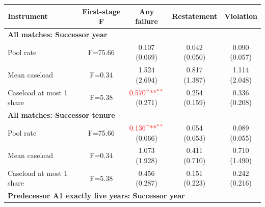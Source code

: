 \documentclass[10pt]{article}
\newcommand{\sym}[1]{\textsuperscript{#1}}
\begin{document}
\begin{minipage}{19cm}\fontsize{10}{12}\selectfont\setlength{\tabcolsep}{4pt}\renewcommand{\arraystretch}{1.12}


\def\sym#1{\ifmmode^{#1}\else\(^{#1}\)\fi}
\centering
{}
\begin{threeparttable}
\begin{tabular}{p{}cccc}
\toprule
Instrument & First-stage F & Any failure & Restatement & Violation \\
\midrule
\multicolumn{5}{l}{\textbf{All matches: Successor year}} \\
Pool rate & F=75.66 & \shortstack{0.107\\(0.069)} & \shortstack{0.042\\(0.050)} & \shortstack{0.090\\(0.057)} \\
Mean caseload & F=0.34 & \shortstack{1.524\\(2.694)} & \shortstack{0.817\\(1.387)} & \shortstack{1.114\\(2.048)} \\
Caseload at most 1 share & F=5.38 & \shortstack{\textcolor{red}{0.570\sym{**}}\\(0.271)} & \shortstack{0.254\\(0.159)} & \shortstack{0.336\\(0.208)} \\
\multicolumn{5}{l}{\textbf{All matches: Successor tenure}} \\
Pool rate & F=75.66 & \shortstack{\textcolor{red}{0.136\sym{**}}\\(0.066)} & \shortstack{0.054\\(0.053)} & \shortstack{0.089\\(0.055)} \\
Mean caseload & F=0.34 & \shortstack{1.073\\(1.928)} & \shortstack{0.411\\(0.710)} & \shortstack{0.710\\(1.490)} \\
Caseload at most 1 share & F=5.38 & \shortstack{0.456\\(0.287)} & \shortstack{0.151\\(0.223)} & \shortstack{0.242\\(0.216)} \\
\multicolumn{5}{l}{\textbf{Predecessor A1 exactly five years: Successor year}} \\

\end{tabular}
\end{threeparttable}
\end{minipage}
\end{document}

